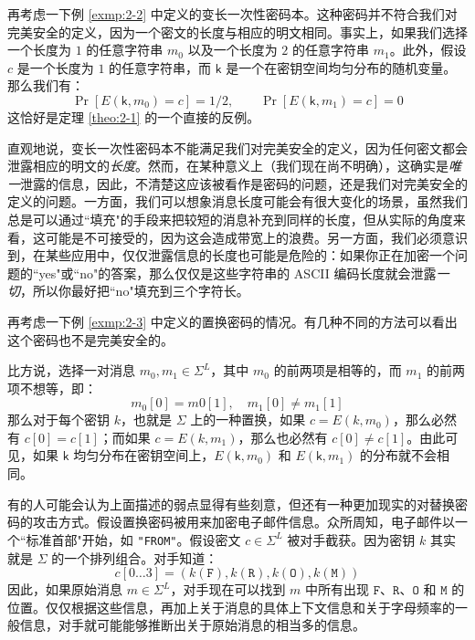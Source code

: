 \begin{example}\label{exmp:2-5}
再考虑一下例 \ref{exmp:2-2} 中定义的变长一次性密码本。这种密码并不符合我们对完美安全的定义，因为一个密文的长度与相应的明文相同。事实上，如果我们选择一个长度为 $1$ 的任意字符串 $m_0$ 以及一个长度为 $2$ 的任意字符串 $m_1$。此外，假设 $c$ 是一个长度为 $1$ 的任意字符串，而 $\mathsf{k}$ 是一个在密钥空间均匀分布的随机变量。那么我们有：
\[
\Pr[E(\mathsf{k},m_0)=c]={1}/{2},
\quad\quad
\Pr[E(\mathsf{k},m_1)=c]=0
\]
这恰好是定理 \ref{theo:2-1} 的一个直接的反例。

直观地说，变长一次性密码本不能满足我们对完美安全的定义，因为任何密文都会泄露相应的明文的\emph{长度}。然而，在某种意义上（我们现在尚不明确），这确实是\emph{唯一}泄露的信息，因此，不清楚这应该被看作是密码的问题，还是我们对完美安全的定义的问题。一方面，我们可以想象消息长度可能会有很大变化的场景，虽然我们总是可以通过``填充"的手段来把较短的消息补充到同样的长度，但从实际的角度来看，这可能是不可接受的，因为这会造成带宽上的浪费。另一方面，我们必须意识到，在某些应用中，仅仅泄露信息的长度也可能是危险的：如果你正在加密一个问题的``yes"或``no"的答案，那么仅仅是这些字符串的 ASCII 编码长度就会泄露\emph{一切}，所以你最好把``no"填充到三个字符长。

\end{example}

\begin{example}\label{exmp:2-6}
再考虑一下例 \ref{exmp:2-3} 中定义的置换密码的情况。有几种不同的方法可以看出这个密码也不是完美安全的。

比方说，选择一对消息 $m_0,m_1\in\Sigma^L$，其中 $m_0$ 的前两项是相等的，而 $m_1$ 的前两项不想等，即：
\[
m_0[0]=m0[1],
\quad
m_1[0]\neq m_1[1]
\]
那么对于每个密钥 $k$，也就是 $\Sigma$ 上的一种置换，如果 $c = E(k,m_0)$，那么必然有 $c[0] = c[1]$；而如果 $c = E(k,m_1)$，那么也必然有 $c[0]\neq c[1]$。由此可见，如果 $\mathsf{k}$ 均匀分布在密钥空间上，$E(\mathsf{k},m_0)$ 和 $E(\mathsf{k},m_1)$ 的分布就不会相同。

有的人可能会认为上面描述的弱点显得有些刻意，但还有一种更加现实的对替换密码的攻击方式。假设置换密码被用来加密电子邮件信息。众所周知，电子邮件以一个``标准首部"开始，如 \texttt{"FROM"}。假设密文 $c\in\Sigma^L$ 被对手截获。因为密钥 $k$ 其实就是 $\Sigma$ 的一个排列组合。对手知道：
\[
c[0\dots3]=(k(\mathtt F),k(\mathtt R),k(\mathtt O),k(\mathtt M))
\]
因此，如果原始消息 $m\in\Sigma^L$，对手现在可以找到 $m$ 中所有出现 $\mathtt F$、$\mathtt R$、$\mathtt O$ 和 $\mathtt M$ 的位置。仅仅根据这些信息，再加上关于消息的具体上下文信息和关于字母频率的一般信息，对手就可能能够推断出关于原始消息的相当多的信息。
\end{example}

